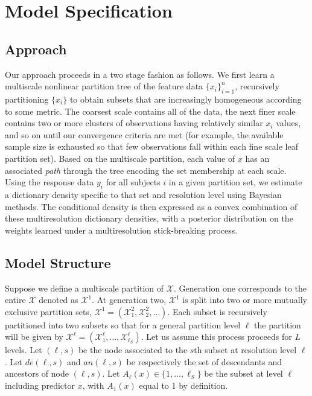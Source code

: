 \documentclass{article}
\begin{document}
\section{Model Specification} %
\label{sec:approach}
\subsection{Approach}

Our approach proceeds in a two stage fashion as follows. We first learn a multiscale nonlinear partition tree of the feature data $\{ x_i \}_{i=1}^n$, recursively partitioning $\{x_i \}$ to obtain subsets that are increasingly homogeneous according to some metric.  The coarsest scale contains all of the data, the next finer scale contains two or more clusters of observations having relatively similar $x_i$ values, and so on until our convergence criteria are met (for example, the available sample size is exhausted so that few observations fall within each fine scale leaf partition set).  Based on the multiscale partition, each value of $x$ has an associated \emph{path} through the tree encoding the set membership at each scale.  Using the response data $y_i$ for all subjects $i$ in a given partition set, we estimate a dictionary density specific to that set and resolution level using Bayesian methods.  The conditional density is then expressed as a convex combination of these multiresolution dictionary densities, with a posterior distribution on the weights learned under a multiresolution stick-breaking process.


\subsection{ Model Structure} 

Suppose we define a multiscale partition of $\mathcal{X}$.  Generation one corresponds to the entire $\mathcal{X}$ denoted as $\mathcal{X}^1$.  At generation two, $\mathcal{X}^1$ is split into two or more mutually exclusive partition sets, $\mathcal{X}^1=\left(\mathcal{X}^2_1, \mathcal{X}^2_2, \ldots \right)$. Each subset is recursively partitioned into two subsets so that for a general partition level $\ell$ the partition will be given by $\mathcal{X}^{\ell}=\left(\mathcal{X}^{\ell}_1, \ldots, \mathcal{X}^{\ell}_{\ell_S}\right)$.  Let us assume this process proceeds for $L$ levels. Let $(\ell,s)$ be the node associated to the $s$th subset at resolution level $\ell$. Let $de(\ell,s)$ and $an(\ell,s)$ be respectively the set of descendants and ancestors of node $(\ell, s)$. Let $A_{\ell}(x) \in \{1, \ldots, \ell_S\}$ be the subset at level $\ell$ including predictor $x$, with $A_1(x)$ equal to 1 by definition. 
\end{document}
